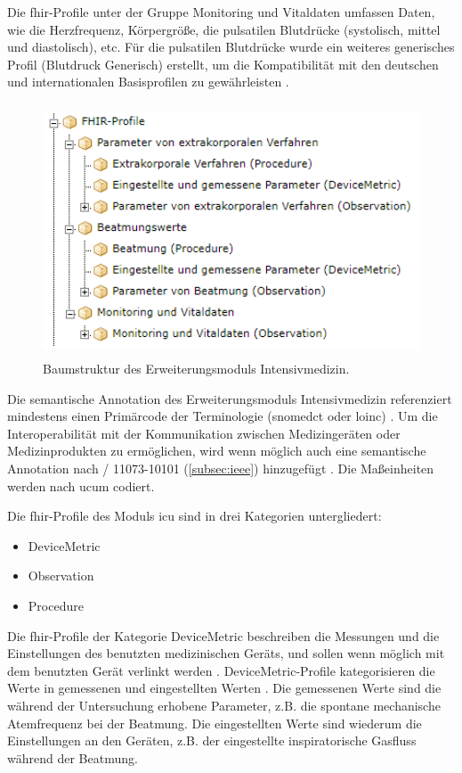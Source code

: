 Die \ac{fhir}-Profile unter der Gruppe Monitoring und Vitaldaten umfassen Daten, wie die Herzfrequenz, Körpergröße, die pulsatilen Blutdrücke (systolisch, mittel und diastolisch), etc. Für die pulsatilen Blutdrücke wurde ein weiteres generisches Profil (Blutdruck Generisch) erstellt, um die Kompatibilität mit den deutschen und internationalen Basisprofilen zu gewährleisten \cite{icukdz}.

\begin{figure}[ht]
	\centering
	\includegraphics[height=7.5cm]{figures/icu_modul_tree}
	\caption[Baumstruktur des Erweiterungsmoduls \glqq Intensivmedizin\grqq{}]{Baumstruktur des Erweiterungsmoduls \glqq Intensivmedizin\grqq{}.}
	\label{fig:icutree}
\end{figure}

Die semantische Annotation des Erweiterungsmoduls \glqq Intensivmedizin\grqq{} referenziert mindestens einen Primärcode der Terminologie (\ac{snomedct} oder \ac{loinc}) \cite{icukdz, modicuvid}. Um die Interoperabilität mit der Kommunikation zwischen Medizingeräten oder Medizinprodukten zu ermöglichen, wird wenn möglich auch eine semantische Annotation nach / 11073-10101\texttrademark{} (\ref{subsec:ieee}) hinzugefügt \cite{icukdz}. Die Maßeinheiten werden nach \ac{ucum} codiert.

Die \ac{fhir}-Profile des Moduls \ac{icu} sind in drei Kategorien untergliedert:

\begin{itemize}
	\item DeviceMetric
	\item Observation
	\item Procedure
\end{itemize}

Die \ac{fhir}-Profile der Kategorie \glqq DeviceMetric\grqq{} beschreiben die Messungen und die Einstellungen des benutzten medizinischen Geräts, und sollen wenn möglich mit dem benutzten Gerät verlinkt werden \cite{icukdz}. \glqq DeviceMetric\grqq{}-Profile kategorisieren die Werte in gemessenen und eingestellten Werten \cite{devicemetric}. Die gemessenen Werte sind die während der Untersuchung erhobene Parameter, z.B. die spontane mechanische Atemfrequenz bei der Beatmung. Die eingestellten Werte sind wiederum die Einstellungen an den Geräten, z.B. der eingestellte inspiratorische Gasfluss während der Beatmung.


